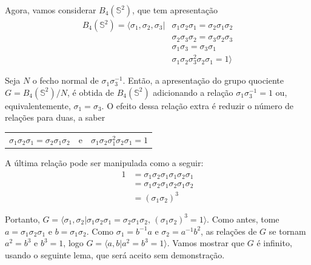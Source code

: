 	\par\vspace{0.3cm} Agora, vamos considerar $B_4(\mathbb{S}^2)$, que tem apresentação
	\begin{align*}
	B_4(\mathbb{S}^2) = \langle \sigma_1, \sigma_2, \sigma_3| &\sigma_1\sigma_2\sigma_1 = \sigma_2\sigma_1\sigma_2 \\ &\sigma_2\sigma_3\sigma_2 = \sigma_3\sigma_2\sigma_3 \\
	&\sigma_1\sigma_3 = \sigma_3\sigma_1\\
	&\sigma_1\sigma_2\sigma_3^2\sigma_2\sigma_1 = 1\rangle
	\end{align*}
	
	\par\vspace{0.3cm} Seja $N$ o fecho normal de $\sigma_1\sigma_3^{-1}$. Então, a apresentação do grupo quociente $G = B_4(\mathbb{S}^2)/N$, é obtida de $B_4(\mathbb{S}^2)$ adicionando a relação $\sigma_1\sigma_3^{-1} = 1$ ou, equivalentemente, $\sigma_1=\sigma_3$. O efeito dessa relação extra é reduzir o número de relações para duas, a saber
	\begin{center}
		\begin{tabular}{ccc}
			$\sigma_1\sigma_2\sigma_1 = \sigma_2\sigma_1\sigma_2$ & e & $\sigma_1\sigma_2\sigma_1^2\sigma_2\sigma_1 = 1$ \\
		\end{tabular}
	\end{center}
	
	\par\vspace{0.3cm} A última relação pode ser manipulada como a seguir:
	\begin{align*}
	1 &= \sigma_1\sigma_2\sigma_1\sigma_1\sigma_2\sigma_1 \\
	&= \sigma_1\sigma_2\sigma_1\sigma_2\sigma_1\sigma_2 \\ 
	&= (\sigma_1\sigma_2)^3  
	\end{align*}
	\par\vspace{0.3cm} Portanto, $G = \langle \sigma_1, \sigma_2| \sigma_1\sigma_2\sigma_1=\sigma_2\sigma_1\sigma_2\text{, } (\sigma_1\sigma_2)^3=1 \rangle$. Como antes, tome $a = \sigma_1\sigma_2\sigma_1$ e $b = \sigma_1\sigma_2$. Como $\sigma_1 = b^{-1}a$ e $\sigma_2 = a^{-1}b^2$, as relações de $G$ se tornam $a^2 = b^3$ e $b^3 = 1$, logo $G = \langle a,b|a^2=b^3=1 \rangle$. Vamos mostrar que $G$ é infinito, usando o seguinte lema, que será aceito sem demonstração.
	
